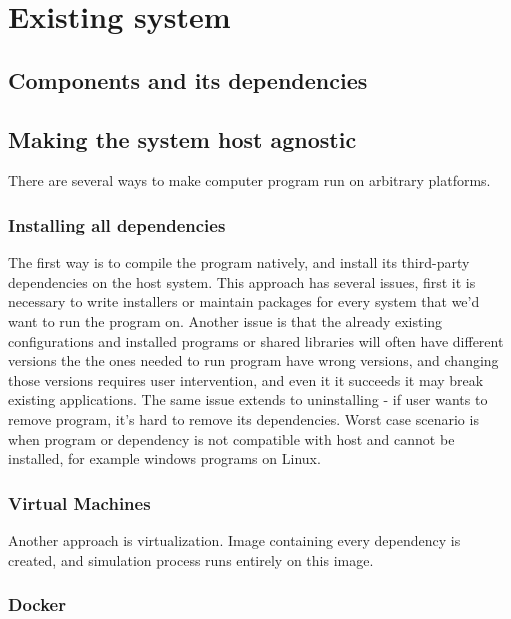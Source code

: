 \chapter{Existing system}
\section{Components and its dependencies}
\section{Making the system host agnostic}
There are several ways to make computer program run on arbitrary platforms.
\subsection{Installing all dependencies}
The first way is to compile the program natively, and install its third-party dependencies on the host system. This approach has several issues, first it is necessary to write installers or maintain packages for every system that we'd want to run the program on. Another issue is that the already existing configurations and installed programs or shared libraries will often have different versions the the ones needed to run program have wrong versions, and changing those versions requires user intervention, and even it it succeeds it may break existing applications. The same issue extends to uninstalling - if user wants to remove program, it's hard to remove its dependencies. Worst case scenario is when program or dependency is not compatible with host and cannot be installed, for example windows programs on Linux. 
\subsection{Virtual Machines}
Another approach is virtualization. Image containing every dependency is created, and simulation process runs entirely on this image.
\subsection{Docker}
